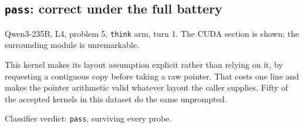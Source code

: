 \documentclass[12pt]{article}
\begin{document}
\subsection*{\texttt{pass}: correct under the full battery}

\noindent Qwen3-235B, L4, problem 5, \texttt{think} arm, turn 1. The CUDA
section is shown; the surrounding module is unremarkable.



\noindent This kernel makes its layout assumption explicit rather than relying
on it, by requesting a contiguous copy before taking a raw pointer. That costs
one line and makes the pointer arithmetic valid whatever layout the caller
supplies. Fifty of the accepted kernels in this dataset do the same unprompted.

\noindent Classifier verdict: \texttt{pass}, surviving every probe.
\end{document}
